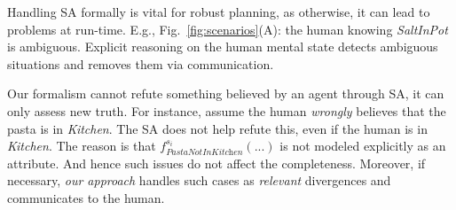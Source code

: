 \documentclass[letterpaper]{article} %
\begin{document}
Handling SA formally is vital for robust planning, as otherwise, it can lead to problems at run-time. 
E.g., Fig.~\ref{fig:scenarios}(A): the human knowing \textit{SaltInPot} is ambiguous. 
Explicit reasoning on the human mental state detects ambiguous situations and removes them via communication. 

Our formalism cannot refute something believed by an agent through SA, it can only assess new truth. 
For instance, 
assume the human \textit{wrongly} believes that the pasta is in \textit{Kitchen}. The SA does not help refute this, even if the human is in \textit{Kitchen}. 
The reason is that $f_{\textit{PastaNotInKitchen}}^{s_i}(...)$ is not modeled explicitly as an attribute. 
And hence such issues do not affect the completeness. 
Moreover, if necessary, \textit{our approach} handles such cases as \textit{relevant} divergences and communicates to the human.


\end{document}
